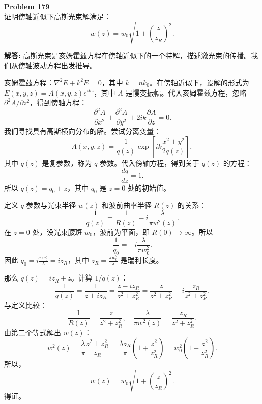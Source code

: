 \documentclass[12pt, a4paper, oneside]{ctexart}
\newenvironment{solution}{\par\noindent\textbf{解答:}\quad}{\par}
\begin{document}
\begin{mdframed}[backgroundcolor=gray!10, linewidth=0pt]
    \textbf{Problem 179} \\
    证明傍轴近似下高斯光束解满足：
    \[
    w(z) = w_0 \sqrt{1 + \left( \frac{z}{z_R} \right)^2 }.
    \]
\end{mdframed}
\begin{solution}
    高斯光束是亥姆霍兹方程在傍轴近似下的一个特解，描述激光束的传播。我们从傍轴波动方程出发推导。

    亥姆霍兹方程：$\nabla^2 E + k^2 E = 0$，其中 $k = n k_0$。在傍轴近似下，设解的形式为 $E(x,y,z) = A(x,y,z) e^{i k z}$，其中 $A$ 是慢变振幅。代入亥姆霍兹方程，忽略 $\partial^2 A/\partial z^2$，得到傍轴方程：
    \[
    \frac{\partial^2 A}{\partial x^2} + \frac{\partial^2 A}{\partial y^2} + 2 i k \frac{\partial A}{\partial z} = 0.
    \]
    我们寻找具有高斯横向分布的解。尝试分离变量：
    \[
    A(x,y,z) = \frac{1}{q(z)} \exp\left[ i k \frac{x^2+y^2}{2 q(z)} \right],
    \]
    其中 $q(z)$ 是复参数，称为 $q$ 参数。代入傍轴方程，得到关于 $q(z)$ 的方程：
    \[
    \frac{dq}{dz} = 1.
    \]
    所以 $q(z) = q_0 + z$，其中 $q_0$ 是 $z=0$ 处的初始值。

    定义 $q$ 参数与光束半径 $w(z)$ 和波前曲率半径 $R(z)$ 的关系：
    \[
    \frac{1}{q(z)} = \frac{1}{R(z)} - i \frac{\lambda}{\pi w^2(z)}.
    \]
    在 $z=0$ 处，设光束腰斑 $w_0$，波前为平面，即 $R(0) \to \infty$。所以
    \[
    \frac{1}{q_0} = - i \frac{\lambda}{\pi w_0^2}.
    \]
    因此 $q_0 = i \frac{\pi w_0^2}{\lambda} = i z_R$，其中 $z_R = \frac{\pi w_0^2}{\lambda}$ 是瑞利长度。

    那么 $q(z) = i z_R + z$。计算 $1/q(z)$：
    \[
    \frac{1}{q(z)} = \frac{1}{z + i z_R} = \frac{z - i z_R}{z^2 + z_R^2} = \frac{z}{z^2+z_R^2} - i \frac{z_R}{z^2+z_R^2}.
    \]
    与定义比较：
    \[
    \frac{1}{R(z)} = \frac{z}{z^2+z_R^2}, \quad \frac{\lambda}{\pi w^2(z)} = \frac{z_R}{z^2+z_R^2}.
    \]
    由第二个等式解出 $w(z)$：
    \[
    w^2(z) = \frac{\lambda}{\pi} \frac{z^2+z_R^2}{z_R} = \frac{\lambda z_R}{\pi} \left( 1 + \frac{z^2}{z_R^2} \right) = w_0^2 \left( 1 + \frac{z^2}{z_R^2} \right).
    \]
    所以，
    \[
    w(z) = w_0 \sqrt{ 1 + \left( \frac{z}{z_R} \right)^2 }.
    \]
    得证。
\end{solution}
\end{document}
